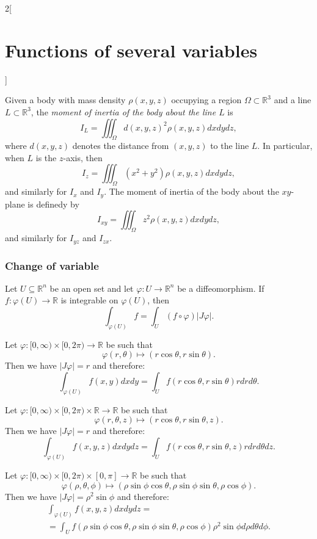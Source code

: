\documentclass[class=article,10pt,crop=false]{standalone}
\begin{document}
\begin{multicols}{2}[\section{Functions of several variables}]
\begin{definition}
Given a body with mass density $\rho(x,y,z)$ occupying a region $\Omega\subset\mathbb{R}^3$ and a line $L\subset\mathbb{R}^3$, the \textit{moment of inertia of the body about the line $L$} is $$I_L=\iiint_\Omega d(x,y,z)^2\rho(x,y,z)dxdydz,$$ where $d(x,y,z)$ denotes the distance from $(x,y,z)$ to the line $L$. In particular, when $L$ is the $z$-axis, then $$I_z=\iiint_\Omega (x^2+y^2)\rho(x,y,z)dxdydz,$$ and similarly for $I_x$ and $I_y$. The moment of inertia of the body about the $xy$-plane is definedy by $$I_{xy}=\iiint_\Omega z^2\rho(x,y,z)dxdydz,$$ and similarly for $I_{yz}$ and $I_{zx}.$
\end{definition}
\subsubsection*{Change of variable}
\begin{theorem}
Let $U\subseteq\mathbb{R}^n$ be an open set and let $\varphi:U\rightarrow\mathbb{R}^n$ be a diffeomorphism. If $f:\varphi(U)\rightarrow\mathbb{R}$ is integrable on $\varphi(U)$, then $$\int_{\varphi(U)} f=\int_U(f\circ\varphi)|J\varphi|.$$
\end{theorem}
\begin{corollary}
Let $\varphi:[0,\infty)\times[0,2\pi)\rightarrow\mathbb{R}$ be such that
$$\varphi(r,\theta)\longmapsto(r\cos\theta,r\sin\theta).$$
Then we have $|J\varphi|=r$ and therefore: $$\int_{\varphi(U)}f(x,y)dxdy=\int_Uf(r\cos\theta,r\sin\theta)rdrd\theta.$$
\end{corollary}
\begin{corollary}
Let $\varphi:[0,\infty)\times[0,2\pi)\times\mathbb{R}\rightarrow\mathbb{R}$ be such that $$\varphi(r,\theta,z)\longmapsto(r\cos\theta,r\sin\theta,z).$$
Then we have $|J\varphi|=r$ and therefore: $$\int_{\varphi(U)}f(x,y,z)dxdydz=\int_Uf(r\cos\theta,r\sin\theta,z)rdrd\theta dz.$$
\end{corollary}
\begin{corollary}
Let $\varphi:[0,\infty)\times[0,2\pi)\times[0,\pi]\rightarrow\mathbb{R}$ be such that $$\varphi(\rho,\theta,\phi)\longmapsto(\rho\sin\phi\cos\theta,\rho\sin\phi\sin\theta,\rho\cos\phi).$$
Then we have $|J\varphi|=\rho^2\sin\phi$ and therefore:
\begin{multline*}
    \int_{\varphi(U)}f(x,y,z)dxdydz=\\=\int_Uf(\rho\sin\phi\cos\theta,\rho\sin\phi\sin\theta,\rho\cos\phi)\rho^2\sin\phi d\rho d\theta d\phi.
\end{multline*}
\end{corollary}

\end{multicols}
\end{document}
